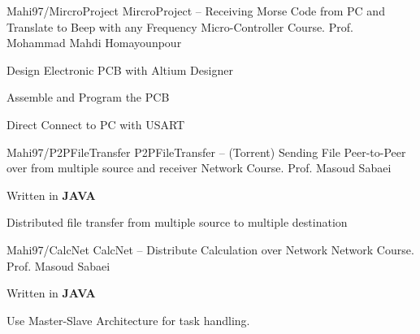 \begin{cventries}
    \cventry
    {Mahi97/MircroProject} %
    {MircroProject -- Receiving Morse Code from PC and Translate to Beep with any Frequency} %
    {Micro-Controller Course.} %
    {Prof. Mohammad Mahdi Homayounpour} %
    {
      \begin{cvitems} %
        \item {Design Electronic PCB with Altium Designer}
        \item {Assemble and Program the PCB}
        \item {Direct Connect to PC with USART}
      \end{cvitems}
    }

    \cventry
    {Mahi97/P2PFileTransfer} %
    {P2PFileTransfer -- (Torrent) Sending File Peer-to-Peer over from multiple source and receiver} %
    {Network Course.} %
    {Prof. Masoud Sabaei} %
    {
      \begin{cvitems} %
        \item {Written in \textbf{JAVA}}
        \item {Distributed file transfer from multiple source to multiple destination}
      \end{cvitems}
    }

    
    \cventry
    {Mahi97/CalcNet} %
    {CalcNet -- Distribute Calculation over Network} %
    {Network Course.} %
    {Prof. Masoud Sabaei} %
    {
      \begin{cvitems} %
        \item {Written in \textbf{JAVA}}
        \item {Use Master-Slave Architecture for task handling.}
      \end{cvitems}
    }



\end{cventries}